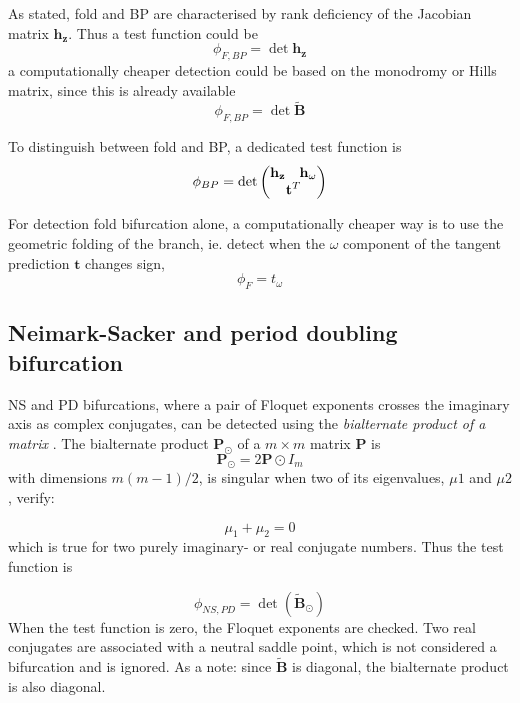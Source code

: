 As stated, fold and BP are characterised by rank deficiency of the
Jacobian matrix $\bm h_{\bm z}$. Thus a test function could be
\begin{equation}
  \phi_{F,BP} = \det{\bm h_{\bm z}}
\end{equation}
a computationally cheaper detection could be based on the monodromy or Hills
matrix, since this is already available
\begin{equation}
  \phi_{F,BP} = \det{\tilde{\bm B}}
\end{equation}

To distinguish between fold and BP, a dedicated test function is
\begin{equation}
  \phi_{BP} = \det
    \begin{pmatrix}
      \bm h_{\bm z} & \bm h_{\omega} \\
      \multicolumn{2}{c}{\bm t^T}
    \end{pmatrix}
\end{equation}

For detection fold bifurcation alone, a computationally cheaper way is to use
the geometric folding of the branch, ie. detect when the $\omega$ component of
the tangent prediction $\bm t$ changes sign,
\begin{equation}
  \phi_{F} = t_\omega
\end{equation}

\subsection{Neimark-Sacker and period doubling bifurcation}

NS and PD bifurcations, where a pair of Floquet exponents crosses the imaginary
axis as complex conjugates, can be detected using the \textit{bialternate
  product of a matrix} \autocite{kuznetsov2013a}. The bialternate product $\bm
P_\odot $ of a $m \times m$ matrix $\bm P$ is
\begin{equation}
  \bm P_\odot = 2\bm P \odot I_m
\end{equation}
with dimensions $m(m-1)/2$, is singular when two of its eigenvalues, $\mu 1$ and
$\mu 2$, verify:

\begin{equation}
  \mu_1 + \mu_2 = 0
\end{equation}
which is true for two purely imaginary- or real conjugate numbers. Thus the test
function is

\begin{equation}
  \phi_{NS,PD} = \det \left( \tilde{\bm B}_\odot \right)
\end{equation}
When the test function is zero, the Floquet exponents are checked. Two real
conjugates are associated with a neutral saddle point, which is not considered a
bifurcation and is ignored.
As a note: since $\tilde{\bm B}$ is diagonal, the bialternate product is also
diagonal.

